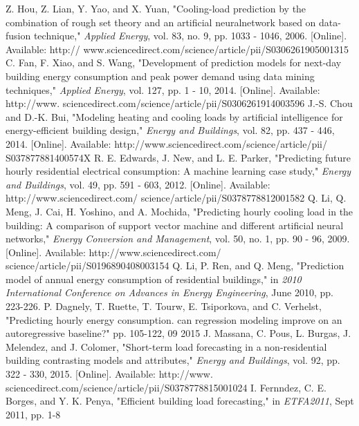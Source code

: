 \documentclass[conference]{IEEEtran}
\begin{document}
\begin{thebibliography}{00}
 Z. Hou, Z. Lian, Y. Yao, and X. Yuan, "Cooling-load prediction
by the combination of rough set theory and an artificial neuralnetwork based on data-fusion technique," \textit{Applied Energy},
vol. 83, no. 9, pp. 1033 - 1046, 2006. [Online]. Available: http://
	www.sciencedirect.com/science/article/pii/S0306261905001315
 C. Fan, F. Xiao, and S. Wang, "Development of prediction models for next-day building energy consumption and peak
power demand using data mining techniques," \textit{Applied Energy},
vol. 127, pp. 1 - 10, 2014. [Online]. Available: http://www.
	sciencedirect.com/science/article/pii/S0306261914003596
 J.-S. Chou and D.-K. Bui, "Modeling heating and cooling loads
by artificial intelligence for energy-efficient building design,"
\textit{Energy and Buildings}, vol. 82, pp. 437 - 446, 2014. [Online].
	Available: http://www.sciencedirect.com/science/article/pii/
	S037877881400574X
 R. E. Edwards, J. New, and L. E. Parker, "Predicting
future hourly residential electrical consumption: A machine
learning case study," \textit{Energy and Buildings}, vol. 49, pp. 591 -
	603, 2012. [Online]. Available: http://www.sciencedirect.com/
	science/article/pii/S0378778812001582
Q. Li, Q. Meng, J. Cai, H. Yoshino, and A. Mochida,
"Predicting hourly cooling load in the building: A comparison of
support vector machine and different artificial neural networks,"
\textit{Energy Conversion and Management}, vol. 50, no. 1, pp. 90
- 96, 2009. [Online]. Available: http://www.sciencedirect.com/
	science/article/pii/S0196890408003154
 Q. Li, P. Ren, and Q. Meng, "Prediction model of annual energy consumption of residential buildings," in \textit{2010 International
Conference on Advances in Energy Engineering}, June 2010, pp.
223-226.
P. Dagnely, T. Ruette, T. Tourw, E. Tsiporkova, and C. Verhelst,
"Predicting hourly energy consumption. can regression modeling
improve on an autoregressive baseline?" pp. 105-122, 09 2015
J. Massana, C. Pous, L. Burgas, J. Melendez, and J. Colomer,
"Short-term load forecasting in a non-residential building
contrasting models and attributes," \textit{Energy and Buildings},
vol. 92, pp. 322 - 330, 2015. [Online]. Available: http://www.
	sciencedirect.com/science/article/pii/S0378778815001024
 I. Fernndez, C. E. Borges, and Y. K. Penya, "Efficient building
load forecasting," in \textit{ETFA2011}, Sept 2011, pp. 1-8
\end{thebibliography}
\end{document}
